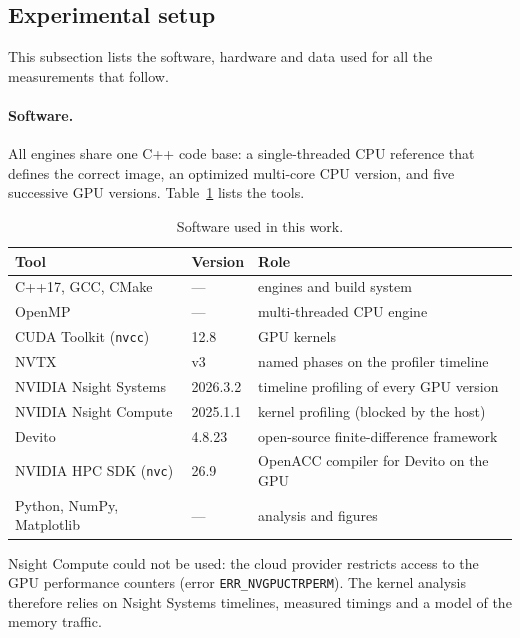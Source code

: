 \documentclass[letterpaper,11pt,leqno]{article}
\begin{document}
\subsection{Experimental setup}

This subsection lists the software, hardware and data used for all the
measurements that follow.

\paragraph{Software.}
All engines share one C++ code base: a single-threaded CPU reference that
defines the correct image, an optimized multi-core CPU version, and five
successive GPU versions. Table~\ref{tab:software} lists the tools.

\begin{table}[htbp]
\centering
\caption{Software used in this work.}
\label{tab:software}
\begin{tabular}{lll}
\toprule
Tool                        & Version        & Role \\
\midrule
C++17, GCC, CMake           & ---            & engines and build system \\
OpenMP                      & ---            & multi-threaded CPU engine \\
CUDA Toolkit (\texttt{nvcc})& 12.8           & GPU kernels \\
NVTX                        & v3             & named phases on the profiler timeline \\
NVIDIA Nsight Systems       & 2026.3.2       & timeline profiling of every GPU version \\
NVIDIA Nsight Compute       & 2025.1.1       & kernel profiling (blocked by the host) \\
Devito~\citep{Louboutin2019Devito} & 4.8.23   & open-source finite-difference framework \\
NVIDIA HPC SDK (\texttt{nvc}) & 26.9         & OpenACC compiler for Devito on the GPU \\
Python, NumPy, Matplotlib   & ---            & analysis and figures \\
\bottomrule
\end{tabular}
\end{table}

Nsight Compute could not be used: the cloud provider restricts access to
the GPU performance counters (error \texttt{ERR\_NVGPUCTRPERM}). The kernel
analysis therefore relies on Nsight Systems timelines, measured timings and
a model of the memory traffic.
\end{document}
